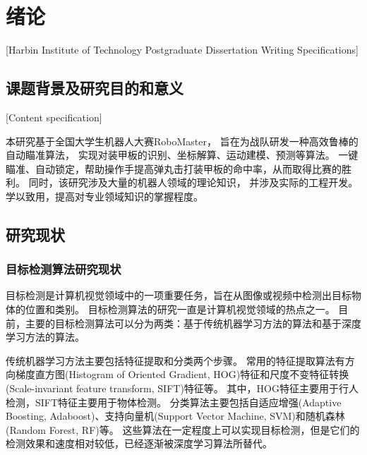 
\chapter[绪论]{绪论}[Harbin Institute of Technology Postgraduate Dissertation Writing Specifications]

\section{课题背景及研究目的和意义}[Content specification]

本研究基于全国大学生机器人大赛RoboMaster，
旨在为战队研发一种高效鲁棒的自动瞄准算法，
实现对装甲板的识别、坐标解算、运动建模、预测等算法。
一键瞄准、自动锁定，帮助操作手提高弹丸击打装甲板的命中率，从而取得比赛的胜利。
同时，该研究涉及大量的机器人领域的理论知识，
并涉及实际的工程开发。学以致用，提高对专业领域知识的掌握程度。

\section{研究现状}

\subsection{目标检测算法研究现状}
目标检测是计算机视觉领域中的一项重要任务，旨在从图像或视频中检测出目标物体的位置和类别。
目标检测算法的研究一直是计算机视觉领域的热点之一。
目前，主要的目标检测算法可以分为两类：基于传统机器学习方法的算法和基于深度学习方法的算法。\par


传统机器学习方法主要包括特征提取和分类两个步骤。
常用的特征提取算法有方向梯度直方图(Histogram of Oriented Gradient, HOG)特征\cite{pang2011efficient}和尺度不变特征转换(Scale-invariant feature transform, SIFT)特征\cite{ng2003sift}等。
其中，HOG特征主要用于行人检测，SIFT特征主要用于物体检测。
分类算法主要包括自适应增强(Adaptive Boosting, Adaboost)\cite{hastie2009multi}、支持向量机(Support Vector Machine, SVM)\cite{schuldt2004recognizing}和随机森林(Random Forest, RF)\cite{biau2016random}等。
这些算法在一定程度上可以实现目标检测，但是它们的检测效果和速度相对较低，已经逐渐被深度学习算法所替代。

\par

